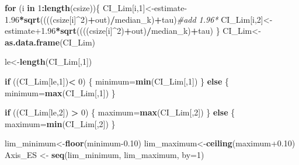 \documentclass[
]{book}
\newenvironment{Shaded}{\begin{snugshade}}{\end{snugshade}}
\newcommand{\AttributeTok}[1]{\textcolor[rgb]{0.13,0.29,0.53}{#1}}
\newcommand{\CommentTok}[1]{\textcolor[rgb]{0.56,0.35,0.01}{\textit{#1}}}
\newcommand{\ControlFlowTok}[1]{\textcolor[rgb]{0.13,0.29,0.53}{\textbf{#1}}}
\newcommand{\DecValTok}[1]{\textcolor[rgb]{0.00,0.00,0.81}{#1}}
\newcommand{\FloatTok}[1]{\textcolor[rgb]{0.00,0.00,0.81}{#1}}
\newcommand{\FunctionTok}[1]{\textcolor[rgb]{0.13,0.29,0.53}{\textbf{#1}}}
\newcommand{\NormalTok}[1]{#1}
\newcommand{\OtherTok}[1]{\textcolor[rgb]{0.56,0.35,0.01}{#1}}
\newcommand{\SpecialCharTok}[1]{\textcolor[rgb]{0.81,0.36,0.00}{\textbf{#1}}}
\begin{document}
\begin{Shaded}
\begin{Highlighting}[]
  \ControlFlowTok{for}\NormalTok{ (i }\ControlFlowTok{in} \DecValTok{1}\SpecialCharTok{:}\FunctionTok{length}\NormalTok{(csize))\{}
\NormalTok{    CI\_Lim[i,}\DecValTok{1}\NormalTok{]}\OtherTok{\textless{}{-}}\NormalTok{estimate}\FloatTok{{-}1.96}\SpecialCharTok{*}\FunctionTok{sqrt}\NormalTok{((((csize[i]}\SpecialCharTok{\^{}}\DecValTok{2}\NormalTok{)}\SpecialCharTok{+}\NormalTok{out)}\SpecialCharTok{/}\NormalTok{median\_k)}\SpecialCharTok{+}\NormalTok{tau)}\CommentTok{\#add 1.96*}
\NormalTok{    CI\_Lim[i,}\DecValTok{2}\NormalTok{]}\OtherTok{\textless{}{-}}\NormalTok{estimate}\FloatTok{+1.96}\SpecialCharTok{*}\FunctionTok{sqrt}\NormalTok{((((csize[i]}\SpecialCharTok{\^{}}\DecValTok{2}\NormalTok{)}\SpecialCharTok{+}\NormalTok{out)}\SpecialCharTok{/}\NormalTok{median\_k)}\SpecialCharTok{+}\NormalTok{tau)}
\NormalTok{  \}}
\NormalTok{  CI\_Lim}\OtherTok{\textless{}{-}}\FunctionTok{as.data.frame}\NormalTok{(CI\_Lim)}
  
\NormalTok{le}\OtherTok{\textless{}{-}}\FunctionTok{length}\NormalTok{(CI\_Lim[,}\DecValTok{1}\NormalTok{])}


  
  \ControlFlowTok{if}\NormalTok{ ((CI\_Lim[le,}\DecValTok{1}\NormalTok{])}\SpecialCharTok{\textless{}} \DecValTok{0}\NormalTok{) \{}
\NormalTok{    minimum}\OtherTok{=}\FunctionTok{min}\NormalTok{(CI\_Lim[,}\DecValTok{1}\NormalTok{])}
\NormalTok{  \} }\ControlFlowTok{else}\NormalTok{ \{}
\NormalTok{    minimum}\OtherTok{=}\FunctionTok{max}\NormalTok{(CI\_Lim[,}\DecValTok{1}\NormalTok{])}
\NormalTok{  \} }
  
  \ControlFlowTok{if}\NormalTok{ ((CI\_Lim[le,}\DecValTok{2}\NormalTok{]) }\SpecialCharTok{\textgreater{}} \DecValTok{0}\NormalTok{) \{}
\NormalTok{    maximum}\OtherTok{=}\FunctionTok{max}\NormalTok{(CI\_Lim[,}\DecValTok{2}\NormalTok{])}
\NormalTok{  \} }\ControlFlowTok{else}\NormalTok{ \{}
\NormalTok{    maximum}\OtherTok{=}\FunctionTok{min}\NormalTok{(CI\_Lim[,}\DecValTok{2}\NormalTok{])}
\NormalTok{  \} }
  
  
\NormalTok{  lim\_minimum}\OtherTok{\textless{}{-}}\FunctionTok{floor}\NormalTok{(minimum}\FloatTok{{-}0.10}\NormalTok{)}
\NormalTok{  lim\_maximum}\OtherTok{\textless{}{-}}\FunctionTok{ceiling}\NormalTok{(maximum}\FloatTok{+0.10}\NormalTok{)}
\NormalTok{  Axis\_ES }\OtherTok{\textless{}{-}} \FunctionTok{seq}\NormalTok{(lim\_minimum, lim\_maximum, }\AttributeTok{by=}\DecValTok{1}\NormalTok{)}
  

\end{Highlighting}
\end{Shaded}
\end{document}
